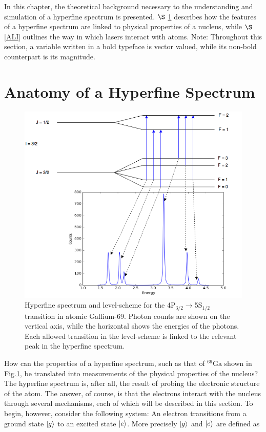 In this chapter, the theoretical background necessary to the understanding and simulation of a hyperfine spectrum is presented. $\S$ \ref{AHF} describes how the features of a hyperfine spectrum are linked to physical properties of a nucleus, while $\S$ \ref{ALI} outlines the way in which lasers interact with atoms.
Note: Throughout this section, a variable written in a bold typeface is vector valued, while its non-bold counterpart is its magnitude. 
\section{Anatomy of a Hyperfine Spectrum}
\label{AHF}
\begin{figure}[h]
\includegraphics[width=\textwidth]{Graphics/spec_with_peaks_4.png}
\caption[Hyperfine spectrum and level-scheme for Gallium-69.]{Hyperfine spectrum and level-scheme for the 4P$_{3/2}\rightarrow$5S$_{1/2}$ transition in atomic Gallium-69. Photon counts are shown on the vertical axis, while the horizontal shows the energies of the photons. Each allowed transition in the level-scheme is linked to the relevant peak in the hyperfine spectrum.}
\label{ga69}
\end{figure}
How can the properties of a hyperfine spectrum, such as that of $^{69}\mathrm{Ga}$ shown in Fig.\ref{ga69}, be translated into measurements of the physical properties of the nucleus? The hyperfine spectrum is, after all, the result of probing the electronic structure of the atom. The answer, of course, is that the electrons interact with the nucleus through several mechanisms, each of which will be described in this section. To begin, however, consider the following system: An electron transitions from a ground state $\ket{g}$ to an excited state $\ket{e}$. More precisely $\ket{g}$ and $\ket{e}$ are defined as 
